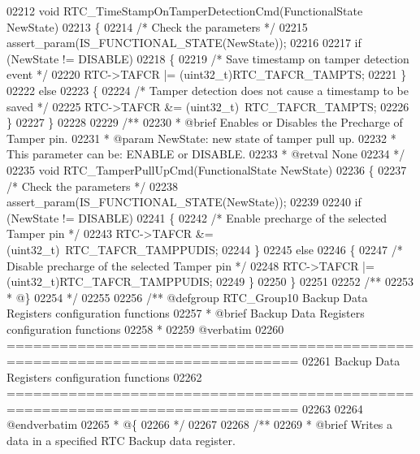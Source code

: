 \begin{DoxyCode}
02212 \textcolor{keywordtype}{void} RTC_TimeStampOnTamperDetectionCmd(FunctionalState NewState)
02213 \{
02214   \textcolor{comment}{/* Check the parameters */}
02215   assert_param(IS\_FUNCTIONAL\_STATE(NewState));
02216 
02217   \textcolor{keywordflow}{if} (NewState != DISABLE)
02218   \{
02219     \textcolor{comment}{/* Save timestamp on tamper detection event */}
02220     RTC->TAFCR |= (uint32\_t)RTC_TAFCR_TAMPTS;
02221   \}
02222   \textcolor{keywordflow}{else}
02223   \{
02224     \textcolor{comment}{/* Tamper detection does not cause a timestamp to be saved */}
02225     RTC->TAFCR &= (uint32\_t)~RTC_TAFCR_TAMPTS;
02226   \}
02227 \}
02228 
02229 \textcolor{comment}{/**}
02230 \textcolor{comment}{  * @brief  Enables or Disables the Precharge of Tamper pin.}
02231 \textcolor{comment}{  * @param  NewState: new state of tamper pull up.}
02232 \textcolor{comment}{  *   This parameter can be: ENABLE or DISABLE.                   }
02233 \textcolor{comment}{  * @retval None}
02234 \textcolor{comment}{  */}
02235 \textcolor{keywordtype}{void} RTC_TamperPullUpCmd(FunctionalState NewState)
02236 \{
02237   \textcolor{comment}{/* Check the parameters */}
02238   assert_param(IS\_FUNCTIONAL\_STATE(NewState));
02239 
02240  \textcolor{keywordflow}{if} (NewState != DISABLE)
02241   \{
02242     \textcolor{comment}{/* Enable precharge of the selected Tamper pin */}
02243     RTC->TAFCR &= (uint32\_t)~RTC_TAFCR_TAMPPUDIS;
02244   \}
02245   \textcolor{keywordflow}{else}
02246   \{
02247     \textcolor{comment}{/* Disable precharge of the selected Tamper pin */}
02248     RTC->TAFCR |= (uint32\_t)RTC_TAFCR_TAMPPUDIS;
02249   \}
02250 \}
02251 
02252 \textcolor{comment}{/**}
02253 \textcolor{comment}{  * @\}}
02254 \textcolor{comment}{  */}
02255 
02256 \textcolor{comment}{/** @defgroup RTC\_Group10 Backup Data Registers configuration functions}
02257 \textcolor{comment}{ *  @brief   Backup Data Registers configuration functions  }
02258 \textcolor{comment}{ *}
02259 \textcolor{comment}{@verbatim   }
02260 \textcolor{comment}{ ===============================================================================}
02261 \textcolor{comment}{                       Backup Data Registers configuration functions }
02262 \textcolor{comment}{ ===============================================================================  }
02263 \textcolor{comment}{}
02264 \textcolor{comment}{@endverbatim}
02265 \textcolor{comment}{  * @\{}
02266 \textcolor{comment}{  */}
02267 
02268 \textcolor{comment}{/**}
02269 \textcolor{comment}{  * @brief  Writes a data in a specified RTC Backup data register.}

\end{DoxyCode}
